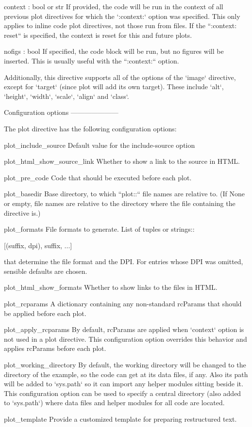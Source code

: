\begin{DoxyVerb}
    context : bool or str
If provided, the code will be run in the context of all
previous plot directives for which the `:context:` option was
specified.  This only applies to inline code plot directives,
not those run from files. If the ``:context: reset`` is specified,
the context is reset for this and future plots.

    nofigs : bool
If specified, the code block will be run, but no figures will
be inserted.  This is usually useful with the ``:context:``
option.

Additionally, this directive supports all of the options of the
`image` directive, except for `target` (since plot will add its own
target).  These include `alt`, `height`, `width`, `scale`, `align` and
`class`.

Configuration options
---------------------

The plot directive has the following configuration options:

    plot_include_source
Default value for the include-source option

    plot_html_show_source_link
Whether to show a link to the source in HTML.

    plot_pre_code
Code that should be executed before each plot.

    plot_basedir
Base directory, to which ``plot::`` file names are relative
to.  (If None or empty, file names are relative to the
directory where the file containing the directive is.)

    plot_formats
File formats to generate. List of tuples or strings::

    [(suffix, dpi), suffix, ...]

that determine the file format and the DPI. For entries whose
DPI was omitted, sensible defaults are chosen.

    plot_html_show_formats
Whether to show links to the files in HTML.

    plot_rcparams
A dictionary containing any non-standard rcParams that should
be applied before each plot.

    plot_apply_rcparams
By default, rcParams are applied when `context` option is not used in
a plot directive.  This configuration option overrides this behavior
and applies rcParams before each plot.

    plot_working_directory
By default, the working directory will be changed to the directory of
the example, so the code can get at its data files, if any.  Also its
path will be added to `sys.path` so it can import any helper modules
sitting beside it.  This configuration option can be used to specify
a central directory (also added to `sys.path`) where data files and
helper modules for all code are located.

    plot_template
Provide a customized template for preparing restructured text.
\end{DoxyVerb}
 

